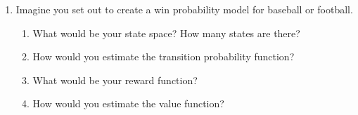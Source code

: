 \documentclass{article}
\begin{document}
      \begin{enumerate}
        \item Imagine you set out to create a win probability model for baseball or football.
        \begin{enumerate}
          \item What would be your state space? How many states are there?
          \item How would you estimate the transition probability function?
          \item What would be your reward function?
          \item How would you estimate the value function?
        \end{enumerate}
      \end{enumerate}
\end{document}

